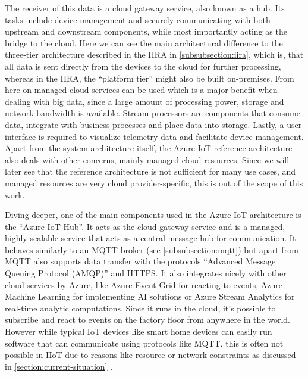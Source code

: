     \noindent The receiver of this data is a cloud gateway service, also known as a hub. Its tasks include device management and securely communicating with both upstream and downstream components, while most importantly acting as the bridge to the cloud. Here we can see the main architectural difference to the three-tier architecture described in the IIRA in \autoref{subsubsection:iira}, which is, that all data is sent directly from the devices to the cloud for further processing, whereas in the IIRA, the ``platform tier'' might also be built on-premises. From here on managed cloud services can be used which is a major benefit when dealing with big data, since a large amount of processing power, storage and network bandwidth is available. Stream processors are components that consume data, integrate with business processes and place data into storage. Lastly, a user interface is required to visualize telemetry data and facilitate device management. Apart from the system architecture itself, the Azure IoT reference architecture also deals with other concerns, mainly managed cloud resources. Since we will later see that the reference architecture is not sufficient for many use cases, and managed resources are very cloud provider-specific, this is out of the scope of this work. \newline
    
    Diving deeper, one of the main components used in the Azure IoT architecture is the ``Azure IoT Hub''. It acts as the cloud gateway service and is a managed, highly scalable service that acts as a central message hub for communication. It behaves similarly to an MQTT broker (see \autoref{subsubsection:mqtt}) but apart from MQTT also supports data transfer with the protocols ``Advanced Message Queuing Protocol (AMQP)'' and HTTPS. It also integrates nicely with other cloud services by Azure, like Azure Event Grid for reacting to events, Azure Machine Learning for implementing AI solutions or Azure Stream Analytics for real-time analytic computations. Since it runs in the cloud, it's possible to subscribe and react to events on the factory floor from anywhere in the world. However while typical IoT devices like smart home devices can easily run software that can communicate using protocols like MQTT, this is often not possible in IIoT due to reasons like resource or network constraints as discussed in \autoref{section:current-situation} \cite{microsoft_azure_iot_reference}.
    

